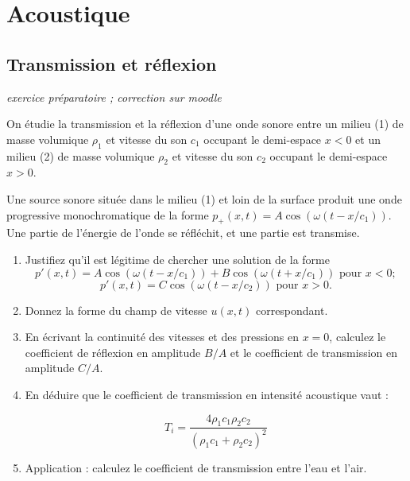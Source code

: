 
\section{Acoustique}

\setcounter{subsection}{-1}
 
 \subsection{Transmission et réflexion}

{\em exercice préparatoire ; correction sur moodle}

On étudie la transmission et la réflexion d'une onde sonore entre un milieu (1) de masse volumique $\rho_1$ et vitesse du son $c_1$ occupant le demi-espace $x<0$ et un milieu (2) de masse volumique $\rho_2$ et vitesse du son $c_2$ occupant le demi-espace $x>0$.

Une source sonore située dans le milieu (1) et loin de la surface produit une onde progressive monochromatique de la forme $p_+(x,t) = A \cos ( \omega (t-x/c_1)) $. Une partie de l'énergie de l'onde se réfléchit, et une partie est transmise.

\begin{enumerate}

\item 
Justifiez qu'il est légitime de chercher une solution de la forme 
$$
p'(x,t) = A \cos ( \omega (t-x/c_1)) + B \cos ( \omega (t+x/c_1)) \mbox{ pour } x<0 ;
$$
$$
p'(x,t) = C \cos ( \omega (t-x/c_2)) \mbox{ pour } x>0.
$$

\item Donnez la forme du champ de vitesse $u(x,t)$ correspondant.

\item En écrivant la continuité des vitesses et des pressions en $x=0$, calculez le coefficient de réflexion en amplitude $B/A$ et le coefficient de transmission en amplitude $C/A$.

\item En déduire que le coefficient de transmission en intensité acoustique vaut :

$$ 
T_i = \frac{4 \rho_1 c_1 \rho_2 c_2}{(\rho_1 c_1+\rho_2 c_2)^2}
$$

\item Application : calculez le coefficient de transmission entre l'eau et l'air.

\end{enumerate}


